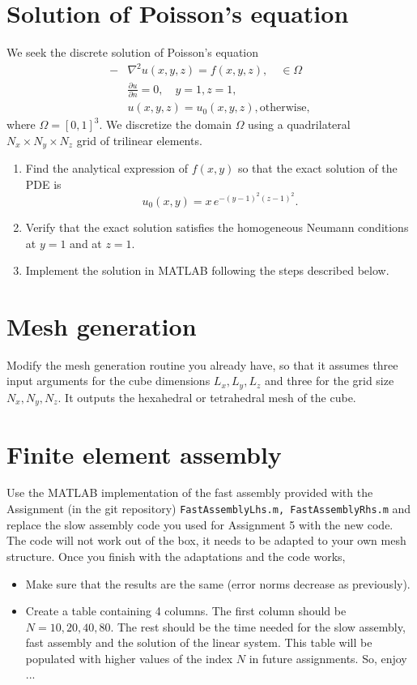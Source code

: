 \documentclass[unicode,11pt,a4paper,oneside,numbers=endperiod,openany]{scrartcl}
\begin{document}
\setassignment
{}

\section*{Solution of Poisson's equation}
We seek the discrete solution of Poisson's equation
\begin{align*}
-&\nabla^2 u(x, y, z) = f(x,y, z), \quad \in \Omega \\
&\frac{\partial{u}}{\partial n}       = 0, \quad y=1, z=1,\\
&u(x, y, z) = u_0(x, y, z), \text{otherwise},
\end{align*}
where $\Omega = [0,1]^3$. We discretize the domain $\Omega$ using a quadrilateral $N_x \times N_y \times N_z$ grid of trilinear elements. 
\begin{enumerate}
\item Find the analytical expression of $f(x,y)$ so that the exact 
solution of the PDE is \[u_0(x,y) =x\, e^{-(y-1)^2 (z-1)^2}.\] 
\item Verify that the exact solution satisfies the homogeneous Neumann conditions
at $y=1$ and at $z=1$. 
\item Implement the solution in \small{MATLAB} following the steps described below.
\end{enumerate}


\section{Mesh generation}
Modify the mesh generation routine you already have,
so that it assumes three input arguments for the cube dimensions $L_x,L_y,L_z$ and 
three for the grid size $N_x,N_y,N_z$. It outputs the hexahedral or tetrahedral mesh of the cube.


\section{Finite element assembly}
Use the MATLAB implementation of the fast assembly provided with the Assignment (in the git repository) \lstinline+FastAssemblyLhs.m, FastAssemblyRhs.m+
and replace the slow assembly code you used for Assignment 5 with the new code. The code will not
work out of the box, it needs to be adapted to your own mesh structure. Once you finish with the adaptations and the code works, 
\begin{itemize}
\item Make sure that the results are the same (error norms decrease as previously).
\item Create a table containing 4 columns. The first column should be $N=10,20,40,80$.
The rest should be the time needed for the slow assembly, 
fast assembly and the solution of the linear system. This table will be populated with higher values of the index $N$ in future assignments. So, enjoy ...
\end{itemize}
\end{document}
